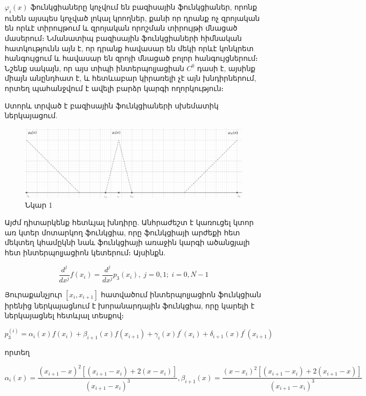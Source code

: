 \documentclass[fleqn, bachelor,subf,12pt,notitlepage]{disser}
\begin{document}
$\varphi_{i}\left(x\right)$ ֆունկցիաները կոչվում են բազիսային ֆունկցիաներ, որոնք ունեն այսպես կոչված լոկալ կրողներ, քանի որ դրանք ոչ զրոյական են որևէ տիրույթում և զրոյական որոշման տիրույթի մնացած մասերում։
Նմանատիպ բազիսային ֆունկցիաների հիմնական հատկությունն այն է, որ դրանք հավասար են մեկի որևէ կոնկրետ հանգույցում և հավասար են զրոյի մնացած բոլոր հանգույցներում։ Նշենք սակայն, որ այս տիպի ինտերպոլյացիան $C^{0}$ դասի է, այսինք միայն անընդհատ է, և հետևաբար կիրառելի չէ այն խնդիրներում, որտեղ պահանջվում է ավելի բարձր կարգի ողորկություն։


\newpage

Ստորև տրված է բազիսային ֆունկցիաների սխեմատիկ ներկայացում.
\begin{figure}[h!]
\centering
\includegraphics[width=1.0\textwidth]{images/one_var_linear}
\captionsetup{labelformat=empty}
\caption{\hfill Նկար 1}
\end{figure}


\newpage

Այժմ դիտարկենք հետևյալ խնդիրը.
Անհրաժեշտ է կառուցել  կտոր առ կտեր մոտարկող ֆունկցիա, որը ֆունկցիայի արժեքի հետ մեկտեղ կհամըկնի նաև ֆունկցիայի առաջին կարգի ածանցյալի հետ ինտերպոլյացիոն կետերում։ Այսինքն.

$$ \dfrac{d^{j}}{dx^j}f(x_{i})=\dfrac{d^{j}}{dx^j}p_{3}(x_{i}),   \; j=0, 1;  \; i=\overline{0, N-1}$$

Յուրաքանչյուր $\left[x_{i}, x_{i+1}\right]$ հատվածում ինտերպոլյացիոն ֆունկցիան իրենից ներկայացնում է խորանարդային ֆունկցիա, որը կարելի է ներկայացնել հետևյալ տեսքով։

$$p_{3}^{\left(i\right)} = \alpha_{i}(x)f(x_{i})+\beta_{i+1}(x)f(x_{i+1})+\gamma_{i}(x)f^{'}(x_{i})+\delta_{i+1}(x)f^{'}(x_{i+1})$$

որտեղ 

$$\alpha_{i}(x)=\dfrac{\left(x_{i+1}-x\right)^{2}\left[\left(x_{i+1}-x_{i}\right)+2\left(x-x_{i}\right)\right]}{\left(x_{i+1}-x_{i}\right)^{3}}, \beta_{i+1}(x)=\dfrac{\left(x-x_{i}\right)^{2}\left[\left(x_{i+1}-x_{i}\right)+2\left(x_{i+1}-x\right)\right]}{\left(x_{i+1}-x_{i}\right)^{3}}$$
\end{document}
